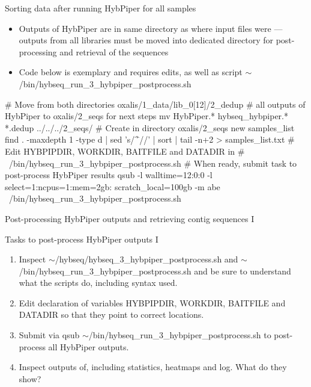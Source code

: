 \documentclass[compress, ucs, xelatex, 11pt, xcolor=x11names, aspectratio=1609,
	hyperref={
		bookmarks=true,
		unicode=true,
		colorlinks=true,
		pdftitle={HybSeq course},
		plainpages=false,
		pdfauthor={Vojtech Zeisek},
		pdfsubject={Practical processing of HybSeq target enrichment sequencing data on computing grids like MetaCentrum},
		pdfcreator={XeLaTeX},
		pdfkeywords={BASH, command line, GNU, HybSeq, Linux, MetaCentrum, sequencing shell, target enrichment},
		linkcolor=Cyan2, %
		anchorcolor=Firebrick2, %
		citecolor=Firebrick2, %
		filecolor=Firebrick2, %
		menucolor=Firebrick2, %
		urlcolor=Chartreuse2, %
		pdftex},
	url={hyphens, lowtilde} %
	]{beamer}
\renewcommand{\texttt}[1]{\colorbox{Snow4}{{\ttfamily #1}}}
\renewcommand{\alert}[1]{\textcolor{OrangeRed2}{#1}}
\begin{document}
\begin{frame}[fragile]{Sorting data after running HybPiper for all samples}
	\begin{itemize}
		\item Outputs of HybPiper are in same directory as where input files were --- outputs from all libraries must be moved into dedicated directory for post-processing and retrieval of the sequences
		\item \alert{Code below is exemplary and requires edits, as well as script \texttt{$\sim$/bin/hybseq\_run\_3\_hybpiper\_postprocess.sh}}
	\end{itemize}
	\begin{bashcode}
    # Move from both directories oxalis/1_data/lib_0[12]/2_dedup
    # all outputs of HybPiper to oxalis/2_seqs for next steps
    mv HybPiper.* hybseq_hybpiper.* *.dedup ../../../2_seqs/
    # Create in directory oxalis/2_seqs new samples_list
    find . -maxdepth 1 -type d | sed 's/^\.\///' | sort |
      tail -n+2 > samples_list.txt
    # Edit HYBPIPDIR, WORKDIR, BAITFILE and DATADIR in
    # ~/bin/hybseq_run_3_hybpiper_postprocess.sh
    # When ready, submit task to post-process HybPiper results
    qsub -l walltime=12:0:0 -l select=1:ncpus=1:mem=2gb:
      scratch_local=100gb -m abe
      ~/bin/hybseq_run_3_hybpiper_postprocess.sh
	\end{bashcode}
\end{frame}

\begin{frame}{Post-processing HybPiper outputs and retrieving contig sequences I}
	\begin{exampleblock}{Tasks to post-process HybPiper outputs I}
		\begin{enumerate}
			\item Inspect \texttt{$\sim$/hybseq/hybseq\_3\_hybpiper\_postprocess.sh} and \texttt{$\sim$/bin/hybseq\_run\_3\_hybpiper\_postprocess.sh} and be sure to understand what the scripts do, including syntax used.
			\item Edit declaration of variables \texttt{HYBPIPDIR}, \texttt{WORKDIR}, \texttt{BAITFILE} and \texttt{DATADIR} so that they point to correct locations.
			\item Submit via \texttt{qsub} \texttt{$\sim$/bin/hybseq\_run\_3\_hybpiper\_postprocess.sh} to post-process all HybPiper outputs.
			\item Inspect outputs of, including statistics, heatmaps and log. What do they show?
		\end{enumerate}
	\end{exampleblock}
\end{frame}
\end{document}

